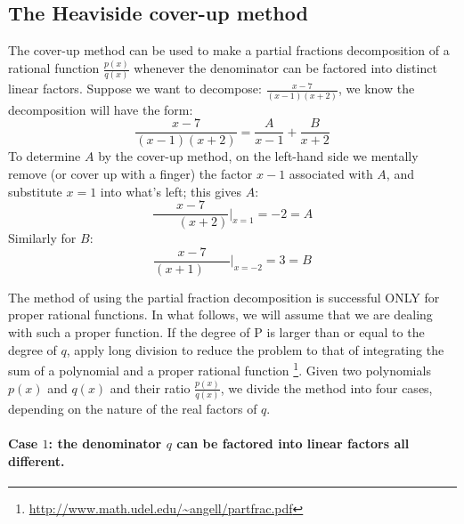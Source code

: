\documentclass[12pt, letterpaper]{article}
\theoremstyle{definition}
\let\tb\textbf
\begin{document}
\subsection{The Heaviside cover-up method}
\label{coverupMethod}
The cover-up method can be used to make a partial fractions decomposition of a rational function $\frac{p(x)}{q(x)}$ whenever the denominator can be factored into distinct linear factors. Suppose we want to decompose: $\frac{x-7}{(x-1)(x+2)}$, we know the decomposition will have the form:
\begin{equation*}
\frac{x-7}{(x-1)(x+2)} = \frac{A}{x-1} +\frac{B}{x+2}
\end{equation*}
To determine $A$ by the cover-up method, on the left-hand side we mentally remove (or cover up with a finger) the factor $x-1$ associated with $A$, and substitute $x=1$ into what's left; this gives $A$:
\begin{equation*}
\frac{x-7}{\quad\quad(x+2)}\bigg\rvert_{x=1} = -2 = A
\end{equation*}
Similarly for $B$:
\begin{equation*}
\frac{x-7}{(x+1)\quad\quad}\bigg\rvert_{x=-2} = 3 = B
\end{equation*}

The method of using the partial fraction decomposition is successful ONLY for proper rational functions. In what follows, we will assume that we are dealing with such a proper function.
If the degree of P is larger than or equal to the degree of $q$, apply long division to reduce the problem to that of integrating the sum of a polynomial and a proper rational function \footnote{\url{http://www.math.udel.edu/~angell/partfrac.pdf}}. Given two polynomials $p(x)$ and $q(x)$ and their ratio $\frac{p(x)}{q(x)}$, we divide the method into four cases, depending on the nature of the real factors of $q$.
\paragraph{\tb{Case $1$: the denominator $q$ can be factored into linear factors all different.}}
\end{document}
